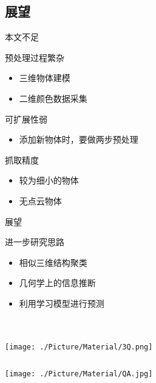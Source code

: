 \documentclass[xcolor=table,compress,blue]{beamer}
\begin{document}
\subsection{展望}
\begin{frame}{本文不足}
	\begin{exampleblock}{预处理过程繁杂}
		\begin{itemize}
			\item 三维物体建模
			\item 二维颜色数据采集
		\end{itemize}
	\end{exampleblock}
	\begin{exampleblock}{可扩展性弱}
		\begin{itemize}
			\item 添加新物体时，要做两步预处理
		\end{itemize}
	\end{exampleblock} 
	 \begin{exampleblock}{抓取精度}
	 	\begin{itemize}
	 		\item 较为细小的物体
	 		\item 无点云物体
	 	\end{itemize}
	 \end{exampleblock}
 
\end{frame}	

\begin{frame}{展望}
	\begin{exampleblock}{进一步研究思路}
		\begin{itemize}
			\item 相似三维结构聚类
			\item 几何学上的信息推断
			\item 利用学习模型进行预测
		\end{itemize}
	\end{exampleblock}
\end{frame}


\section{}
\begin{frame}[plain]
	\thispagestyle{empty}
	\begin{columns}
		\begin{column}{\paperwidth}
			\texttt{[image: ./Picture/Material/3Q.png]}
		\end{column}
	\end{columns}
\end{frame}
\begin{frame}[plain]
	\thispagestyle{empty}
	\begin{columns}
		\begin{column}{\paperwidth}
			\texttt{[image: ./Picture/Material/QA.jpg]}
		\end{column}
	\end{columns}
\end{frame}
\end{document}
